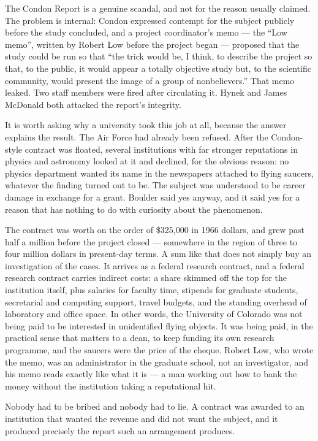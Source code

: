 The Condon Report is a genuine scandal, and not for the reason usually claimed. The problem is
internal: Condon expressed contempt for the subject publicly before the study concluded, and a
project coordinator's memo --- the ``Low memo'', written by Robert Low before the project began
--- proposed that the study could be run so that ``the trick would be, I think, to describe the
project so that, to the public, it would appear a totally objective study but, to the
scientific community, would present the image of a group of nonbelievers.'' That memo leaked.
Two staff members were fired after circulating it. Hynek and James McDonald both attacked the
report's integrity.

It is worth asking why a university took this job at all, because the answer explains the
result. The Air Force had already been refused. After the Condon-style contract was floated,
several institutions with far stronger reputations in physics and astronomy looked at it and
declined, for the obvious reason: no physics department wanted its name in the newspapers
attached to flying saucers, whatever the finding turned out to be. The subject was understood
to be career damage in exchange for a grant. Boulder said yes anyway, and it said yes for a
reason that has nothing to do with curiosity about the phenomenon.

The contract was worth on the order of \$325,000 in 1966 dollars, and grew past half a million
before the project closed --- somewhere in the region of three to four million dollars in
present-day terms. A sum like that does not simply buy an investigation of the cases. It
arrives as a federal research contract, and a federal research contract carries indirect
costs: a share skimmed off the top for the institution itself, plus salaries for faculty time,
stipends for graduate students, secretarial and computing support, travel budgets, and the
standing overhead of laboratory and office space. In other words, the University of Colorado
was not being paid to be interested in unidentified flying objects. It was being paid, in the
practical sense that matters to a dean, to keep funding its own research programme, and the
saucers were the price of the cheque. Robert Low, who wrote the memo, was an administrator in
the graduate school, not an investigator, and his memo reads exactly like what it is --- a man
working out how to bank the money without the institution taking a reputational hit.

 Nobody had to be bribed and nobody had to lie. A contract
was awarded to an institution that wanted the revenue and did not want the subject, and it
produced precisely the report such an arrangement produces.

